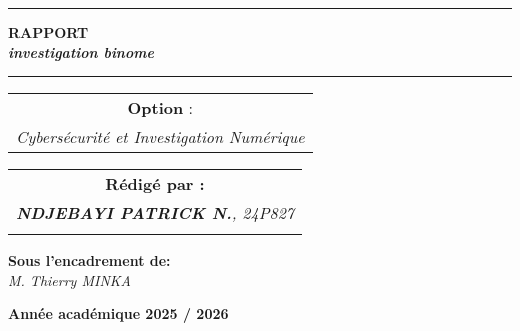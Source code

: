 \documentclass[12pt, a4paper]{article}
\begin{document}
\begin{titlepage}
\begin{center}
		\vspace{0.5cm}
		\begin{tabular}{l*{40}{@{\hskip 3.5cm}c@{\hskip5cm}} p{3.5cm} r}
		\end{tabular}
		
		\noindent\rule{\textwidth}{0.7mm}
		\Large{{\textbf{RAPPORT}}}\\
		\Large{{\textbf{\textit{investigation binome}}}}
		\noindent\rule{\textwidth}{0.7mm}
	\end{center}
		
	\begin{center}
	\begin{tabular}{c}
		
		\vspace{0.1cm}
		\normalsize
	
	
		\vspace{0.1cm}
		\normalsize\textbf{Option }:\\			
		\textsl{Cybersécurité et Investigation Numérique}
		
	\end{tabular}
	\end{center}
		
	\begin{center}
		\normalsize %
		\begin{tabular}{c}
			\vspace{0.07cm}
			\hspace{0.02cm} \textbf{\textbf{Rédigé par :}}\\
			
			\hspace{0.02cm} \textsl{\textbf{NDJEBAYI PATRICK N.}, 24P827}\\\\
			
			
		\end{tabular}
	\end{center}
	
	\begin{center}
	\hspace{0.02cm} \textbf{Sous l'encadrement de:}\\
	\hspace{0.02cm} \textsl{M. Thierry MINKA}
	\end{center}
	
    
	\vspace{2cm}
	\begin{center}
		\textbf{Année académique 2025 / 2026}
	\end{center}
				
	\vfill%
	
\end{titlepage}
\end{document}
